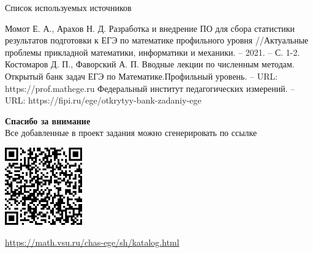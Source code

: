 \documentclass[aspectratio=169,12pt]{beamer}
\begin{document}
\begin{frame}{Список используемых источников}
	\begin{thebibliography}{10}
		 Момот Е. А., Арахов Н. Д. Разработка и внедрение ПО для сбора статистики результатов подготовки к ЕГЭ по математике профильного уровня //Актуальные проблемы прикладной математики, информатики и механики. – 2021. – С. 1-2.
		Костомаров Д. П., Фаворский А. П. Вводные лекции по численным методам.
		Открытый банк задач ЕГЭ по Математике.Профильный уровень. – URL:  https://prof.mathege.ru
		Федеральный институт педагогических измерений. – URL:  https://fipi.ru/ege/otkrytyy-bank-zadaniy-ege

	\end{thebibliography}
\end{frame}

\begin{frame}
	\center\large\textcolor{NordBrightBlue}{\textbf{Спасибо за внимание}}\\
	\hfill \break
	\normalsize
	Все добавленные в проект задания можно сгенерировать по ссылке\\
	\hfill \break

	\includegraphics[width=0.25\textwidth]{images/QR-code}\\
	\hfill \break

	\url{https://math.vsu.ru/chas-ege/sh/katalog.html}
\end{frame}
\end{document}
